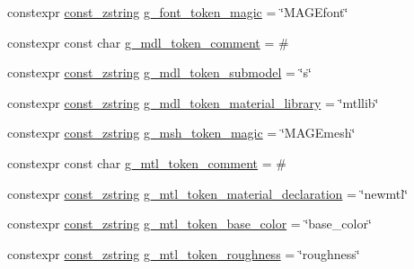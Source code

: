 \begin{DoxyCompactItemize}
\item 
constexpr \mbox{\hyperlink{namespacemage_abfd9206dc607ceb5d13ec68bf075a5c0}{const\+\_\+zstring}} \mbox{\hyperlink{namespacemage_1_1rendering_1_1loader_acc723a2644e074318376fec3a8278711}{g\+\_\+font\+\_\+token\+\_\+magic}} = \char`\"{}M\+A\+G\+Efont\char`\"{}
\item 
constexpr const char \mbox{\hyperlink{namespacemage_1_1rendering_1_1loader_accd79e03f94cc56cddd761a16d7d054e}{g\+\_\+mdl\+\_\+token\+\_\+comment}} = \textquotesingle{}\#\textquotesingle{}
\item 
constexpr \mbox{\hyperlink{namespacemage_abfd9206dc607ceb5d13ec68bf075a5c0}{const\+\_\+zstring}} \mbox{\hyperlink{namespacemage_1_1rendering_1_1loader_a007345d2fdd9db8cedb0a50ff2bface7}{g\+\_\+mdl\+\_\+token\+\_\+submodel}} = \char`\"{}s\char`\"{}
\item 
constexpr \mbox{\hyperlink{namespacemage_abfd9206dc607ceb5d13ec68bf075a5c0}{const\+\_\+zstring}} \mbox{\hyperlink{namespacemage_1_1rendering_1_1loader_ae399195268d14aceb61ebf3c020d0690}{g\+\_\+mdl\+\_\+token\+\_\+material\+\_\+library}} = \char`\"{}mtllib\char`\"{}
\item 
constexpr \mbox{\hyperlink{namespacemage_abfd9206dc607ceb5d13ec68bf075a5c0}{const\+\_\+zstring}} \mbox{\hyperlink{namespacemage_1_1rendering_1_1loader_ac002ee9ece4bdae053226c72336f84e3}{g\+\_\+msh\+\_\+token\+\_\+magic}} = \char`\"{}M\+A\+G\+Emesh\char`\"{}
\item 
constexpr const char \mbox{\hyperlink{namespacemage_1_1rendering_1_1loader_aa434371c99d44cc729773cec213def03}{g\+\_\+mtl\+\_\+token\+\_\+comment}} = \textquotesingle{}\#\textquotesingle{}
\item 
constexpr \mbox{\hyperlink{namespacemage_abfd9206dc607ceb5d13ec68bf075a5c0}{const\+\_\+zstring}} \mbox{\hyperlink{namespacemage_1_1rendering_1_1loader_a169d9aa2df11fab271c025c0937f1126}{g\+\_\+mtl\+\_\+token\+\_\+material\+\_\+declaration}} = \char`\"{}newmtl\char`\"{}
\item 
constexpr \mbox{\hyperlink{namespacemage_abfd9206dc607ceb5d13ec68bf075a5c0}{const\+\_\+zstring}} \mbox{\hyperlink{namespacemage_1_1rendering_1_1loader_a374c1913982c15a9b219effa2e11cad7}{g\+\_\+mtl\+\_\+token\+\_\+base\+\_\+color}} = \char`\"{}base\+\_\+color\char`\"{}
\item 
constexpr \mbox{\hyperlink{namespacemage_abfd9206dc607ceb5d13ec68bf075a5c0}{const\+\_\+zstring}} \mbox{\hyperlink{namespacemage_1_1rendering_1_1loader_a2ec32e8ddd043f1989ca6b58ad964c32}{g\+\_\+mtl\+\_\+token\+\_\+roughness}} = \char`\"{}roughness\char`\"{}

\end{DoxyCompactItemize}
